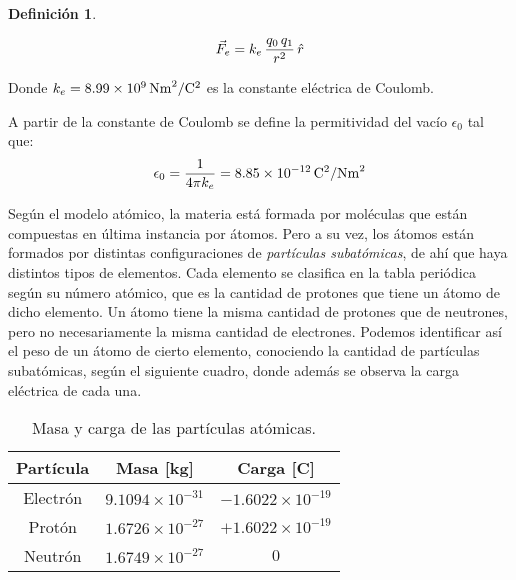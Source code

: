 \documentclass[a5paper,12pt,twoside]{book}
\newtheorem{defn}{{Definición}}[chapter]
\begin{document}
\begin{mdframed}[style=MyFrame1]
    \begin{defn}
    \end{defn}
    \begin{equation*}
        \Vec{F}_e = k_e \, \frac{ q_0 \, q_1}{r^2} \, \hat{r}
    \end{equation*}
\end{mdframed}

Donde $k_e=8.99 \times 10^9\,\si{\newton\metre^2\per\coulomb^2}$ es la constante eléctrica de Coulomb.

A partir de la constante de Coulomb se define la permitividad del vacío $\epsilon_0$ tal que:
\begin{equation}
    \epsilon_0 = \dfrac{1}{4 \pi k_e} = 8.85 \times 10^{-12} \,\si{\coulomb^2\per\newton\metre^2}
\end{equation}

Según el modelo atómico, la materia está formada por moléculas que están compuestas en última instancia por átomos. Pero a su vez, los átomos están formados por distintas configuraciones de \emph{partículas subatómicas}, de ahí que haya distintos tipos de elementos. Cada elemento se clasifica en la tabla periódica según su número atómico, que es la cantidad de protones que tiene un átomo de dicho elemento. Un átomo tiene la misma cantidad de protones que de neutrones, pero no necesariamente la misma cantidad de electrones. Podemos identificar así el peso de un átomo de cierto elemento, conociendo la cantidad de partículas subatómicas, según el siguiente cuadro, donde además se observa la carga eléctrica de cada una.

\begin{table}[h!]
    \begin{center}
        \begin{tabular}{|c|c|c|}
            \hline
            Partícula & Masa [\si{\kilo\gram}] & Carga [\si{\coulomb}]
            \\ \hline \hline
            Electrón & $9.1094 \times 10^{-31}$ & $-1.6022 \times 10^{-19}$
            \\ \hline
            Protón & $1.6726 \times 10^{-27}$ & $+1.6022 \times 10^{-19}$
            \\ \hline
            Neutrón & $1.6749 \times 10^{-27}$ & $0$
            \\ \hline
        \end{tabular}
        \caption{Masa y carga de las partículas atómicas.}
    \end{center}
\end{table}
\end{document}
